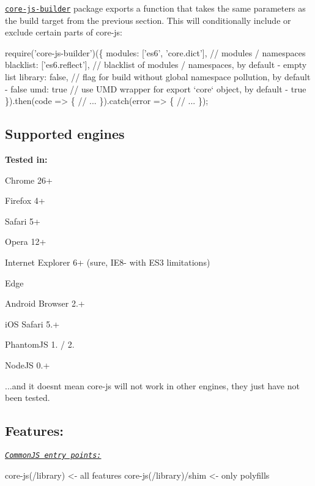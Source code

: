 \href{https://www.npmjs.com/package/core-js-builder}{\tt {\ttfamily core-\/js-\/builder}} package exports a function that takes the same parameters as the {\ttfamily build} target from the previous section. This will conditionally include or exclude certain parts of {\ttfamily core-\/js}\+:


\begin{DoxyCode}
require('core-js-builder')(\{
  modules: ['es6', 'core.dict'], // modules / namespaces
  blacklist: ['es6.reflect'],    // blacklist of modules / namespaces, by default - empty list
  library: false,                // flag for build without global namespace pollution, by default - false
  umd: true                      // use UMD wrapper for export `core` object, by default - true
\}).then(code => \{
  // ...
\}).catch(error => \{
  // ...
\});
\end{DoxyCode}
 \subsection*{Supported engines}

{\bfseries Tested in\+:}
\begin{DoxyItemize}
\item Chrome 26+
\item Firefox 4+
\item Safari 5+
\item Opera 12+
\item Internet Explorer 6+ (sure, I\+E8-\/ with E\+S3 limitations)
\item Edge
\item Android Browser 2.+
\item i\+OS Safari 5.+
\item Phantom\+JS 1. / 2.
\item Node\+JS 0.+
\end{DoxyItemize}

...and it doesn\textquotesingle{}t mean {\ttfamily core-\/js} will not work in other engines, they just have not been tested.

\subsection*{Features\+:}

\href{#commonjs}{\tt {\itshape Common\+JS entry points\+:}} 
\begin{DoxyCode}
core-js(/library)       <- all features
core-js(/library)/shim  <- only polyfills
\end{DoxyCode}
